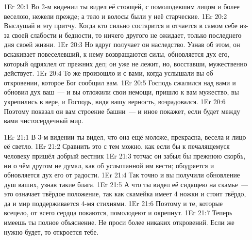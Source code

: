 \vs 1Er 20:1
Во 2-м видении ты видел её стоящей,
с помолодевшим лицом и более веселою, нежели прежде;
а тело и волосы были у неё старческие.
\vs 1Er 20:2
Выслушай и эту притчу.
Когда кто сильно состарится и отчается в самом себе
из-за своей слабости и бедности,
то ничего другого не ожидает,
только последнего дня своей жизни.
\vs 1Er 20:3
Но вдруг получает он наследство.
Узнав об этом, он вскакивает повеселевший, к нему возвращаются
силы, обновляется дух его, который одряхлел от прежних дел;
он уже не лежит, но, восставши, мужественно действует.
\vs 1Er 20:4
То же произошло и с вами, когда услышали вы об откровении,
которое Бог сообщил вам.
\vs 1Er 20:5
Господь сжалился над вами и обновил дух ваш~--- и вы отложили
свои немощи, пришло к вам мужество, вы укрепились в вере,
и Господь, видя вашу верность, возрадовался.
\vs 1Er 20:6
Поэтому показал он вам строение башни~--- и иное покажет,
если будет между вами чистосердечный мир.

\vs 1Er 21:1
В 3-м видении ты видел, что она ещё моложе, прекрасна,
весела и лицо её светло.
\vs 1Er 21:2
Сравнить это с тем можно, как если бы к печалящемуся
человеку пришёл добрый вестник
\vs 1Er 21:3
тотчас он забыл бы прежнюю скорбь,
ни о чём другом не думал, как об услышанной им вести;
ободряется и обновляется дух его от радости.
\vs 1Er 21:4
Так точно и вы получили обновление душ ваших,
узнав такие блага.
\vs 1Er 21:5
А что ты видел её сидящею на скамье~--- это означает
твёрдое положение, так как скамейка имеет 4 ножки и стоит твёрдо,
да и мир поддерживается 4-мя стихиями.
\vs 1Er 21:6
Поэтому и те, которые
всецело, от всего сердца покаются, помолодеют и окрепнут.
\vs 1Er 21:7
Теперь имеешь ты полное объяснение.
Не проси более никаких откровений.
Если же нужно будет, то откроется тебе.

